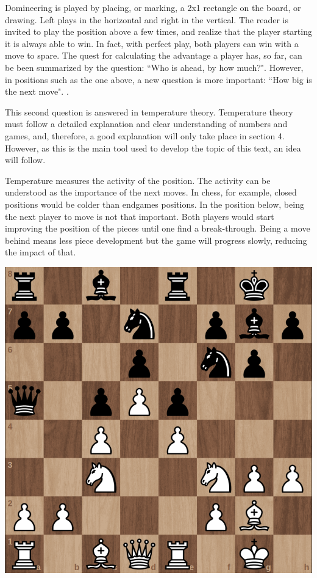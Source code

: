 Domineering is played by placing, or marking, a 2x1 rectangle on the board, or drawing. Left plays in the horizontal and right in the vertical. The reader is invited to play the position above a few times, and realize that the player starting it is always able to win. In fact, with perfect play, both players can win with a move to spare. The quest for calculating the advantage a player has, so far, can be been summarized by the question: ``Who is ahead, by how much?". However, in positions such as the one above, a new question is more important: ``How big is the next move". .

This second question is answered in temperature theory. Temperature theory must follow a detailed explanation and clear understanding of numbers and games, and, therefore, a good explanation will only take place in section 4. However, as this is the main tool used to develop the topic of this text, an idea will follow.

Temperature measures the activity of the position. The activity can be understood as the importance of the next moves. In chess, for example, closed positions would be colder than endgames positions. In the position below, being the next player to move is not that important. Both players would start improving the position of the pieces until one find a break-through. Being a move behind means less piece development but the game will progress slowly, reducing the impact of that.

\begin{center}
\includegraphics[scale=0.15]{images/chess_cold} 
\end{center}

